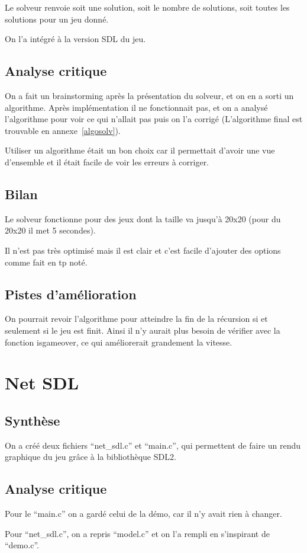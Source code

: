 \documentclass[12pt]{article}
\begin{document}
Le solveur renvoie soit une solution, soit le nombre de solutions, soit toutes les solutions pour un jeu donné.

On l'a intégré à la version SDL du jeu.
\subsection{Analyse critique}
On a fait un brainstorming après la présentation du solveur, et on en a sorti un algorithme. Après implémentation il ne fonctionnait pas, et on a analysé l'algorithme pour voir ce qui n'allait pas puis on l'a corrigé (L'algorithme final est trouvable en annexe~\ref{algosolv}).

Utiliser un algorithme était un bon choix car il permettait d'avoir une vue d'ensemble et il était facile de voir les erreurs à corriger.
\subsection{Bilan}
Le solveur fonctionne pour des jeux dont la taille va jusqu'à 20x20 (pour du 20x20 il met 5 secondes).

Il n'est pas très optimisé mais il est clair et c'est facile d'ajouter des options comme fait en tp noté.
\subsection{Pistes d'amélioration}
On pourrait revoir l'algorithme pour atteindre la fin de la récursion si et seulement si le jeu est finit. Ainsi il n'y aurait plus besoin de vérifier avec la fonction isgameover, ce qui améliorerait grandement la vitesse.



\section{Net SDL}
\subsection{Synthèse}
On a créé deux fichiers ``net\_sdl.c'' et ``main.c'', qui permettent de faire un rendu graphique du jeu grâce à la bibliothèque SDL2.
\subsection{Analyse critique}
Pour le ``main.c'' on a gardé celui de la démo, car il n'y avait rien à changer.

Pour ``net\_sdl.c'', on a repris ``model.c'' et on l'a rempli en s'inspirant de ``demo.c''.
\end{document}
